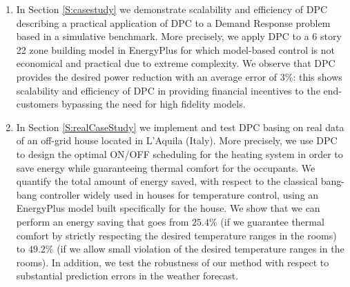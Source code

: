 {\begin{enumerate}
	\item In Section \ref{S:casestudy} we demonstrate scalability and efficiency of DPC describing a practical application of DPC to a Demand Response problem based in a simulative benchmark. More precisely, we apply DPC to a 6 story 22 zone building model in EnergyPlus \cite{Crawley2001} for which model-based control is not economical and practical due to extreme complexity. We observe that DPC provides the desired power reduction with an average error of 3\%: this shows scalability and efficiency of DPC in providing financial incentives to the end-customers bypassing the need for high fidelity models.
	\item In Section \ref{S:realCaseStudy} we implement and test DPC basing on real data of an off-grid house located in L'Aquila (Italy). More precisely, we use DPC to design the optimal ON/OFF scheduling for the heating system in order to save energy while guaranteeing thermal comfort for the occupants. We quantify the total amount of energy saved, with respect to the classical bang-bang controller widely used in houses for temperature control, using an EnergyPlus model built specifically for the house. We show that we can perform an energy saving that goes from $25.4\%$ (if we guarantee thermal comfort by strictly respecting the desired temperature ranges in the rooms) to $49.2\%$ (if we allow small violation of the desired temperature ranges in the rooms). In addition, we test the robustness of our method with respect to substantial prediction errors in the weather forecast.
\end{enumerate}
}


